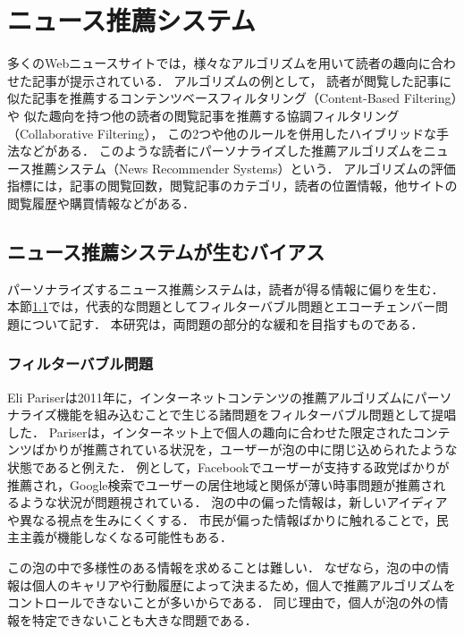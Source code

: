 \documentclass[12pt,a4j]{jreport}
\begin{document}
\section{ニュース推薦システム}
多くのWebニュースサイトでは，様々なアルゴリズムを用いて読者の趣向に合わせた記事が提示されている．
アルゴリズムの例として，
読者が閲覧した記事に似た記事を推薦するコンテンツベースフィルタリング（Content-Based Filtering）や
似た趣向を持つ他の読者の閲覧記事を推薦する協調フィルタリング（Collaborative Filtering），
この2つや他のルールを併用したハイブリッドな手法などがある\cite{karimi_news_2018}．
このような読者にパーソナライズした推薦アルゴリズムをニュース推薦システム（News Recommender Systems）という．
アルゴリズムの評価指標には，記事の閲覧回数，閲覧記事のカテゴリ，読者の位置情報，他サイトの閲覧履歴や購買情報などがある．

\subsection{ニュース推薦システムが生むバイアス}
\label{biases_generated_by_nrs}
パーソナライズするニュース推薦システムは，読者が得る情報に偏りを生む．
本節\ref{biases_generated_by_nrs}では，代表的な問題としてフィルターバブル問題とエコーチェンバー問題について記す．
本研究は，両問題の部分的な緩和を目指すものである．


\subsubsection{フィルターバブル問題}
Eli Pariserは2011年に，インターネットコンテンツの推薦アルゴリズムにパーソナライズ機能を組み込むことで生じる諸問題をフィルターバブル問題として提唱した\cite{pariser_beware_nodate}\cite{bruns_filter_2019}．
Pariserは，インターネット上で個人の趣向に合わせた限定されたコンテンツばかりが推薦されている状況を，ユーザーが泡の中に閉じ込められたような状態であると例えた．
例として，Facebookでユーザーが支持する政党ばかりが推薦され，Google検索でユーザーの居住地域と関係が薄い時事問題が推薦されるような状況が問題視されている．
泡の中の偏った情報は，新しいアイディアや異なる視点を生みにくくする．
市民が偏った情報ばかりに触れることで，民主主義が機能しなくなる可能性もある．

この泡の中で多様性のある情報を求めることは難しい．
なぜなら，泡の中の情報は個人のキャリアや行動履歴によって決まるため，個人で推薦アルゴリズムをコントロールできないことが多いからである．
同じ理由で，個人が泡の外の情報を特定できないことも大きな問題である．
\end{document}
